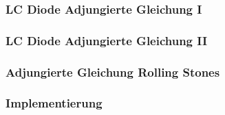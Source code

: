 \begin{frame}
\frametitle{LC Diode Adjungierte Gleichung I}
\begin{minipage}[c]{0.45\textwidth}
\centering
\scalebox{0.9}{}
\scalebox{0.9}{}
\end{minipage}
\begin{minipage}[c]{0.45\textwidth}
\centering
\scalebox{0.9}{}
\scalebox{0.9}{}
\end{minipage}
\end{frame}

\begin{frame}
\frametitle{LC Diode Adjungierte Gleichung II}
\begin{minipage}[c]{0.45\textwidth}
\centering
\scalebox{0.9}{}
\scalebox{0.9}{}
\end{minipage}
\begin{minipage}[c]{0.45\textwidth}
\centering
\scalebox{0.9}{}
\scalebox{0.9}{}
\end{minipage}
\end{frame}




\begin{frame}
\frametitle{Adjungierte Gleichung Rolling Stones}
\begin{minipage}[c]{0.45\textwidth}
\centering
\scalebox{1.1}{}
\end{minipage}
\begin{minipage}[c]{0.45\textwidth}
\centering
\scalebox{1.1}{}
\end{minipage}
\end{frame}




\begin{frame}[fragile]
\frametitle{Implementierung}
\cite{openblas}
\cite{armadillo}
\cite{ADOLCmanual}
\cite{boeck14}
\end{frame}

\setcounter{framenumber}{\value{finalframe}}
